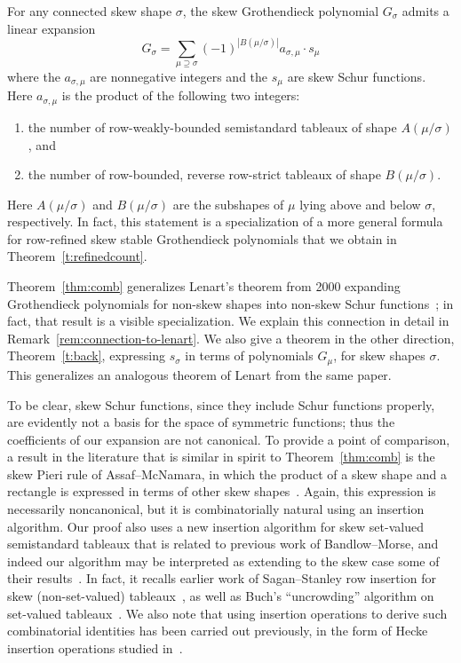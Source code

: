 \documentclass[ALCO,ThmDefs,Unicode,epreuves]{cedram}
\begin{document}
\begin{theo}\label{thm:comb}
For any connected skew shape $\sigma$, the skew Grothendieck polynomial $G_\sigma$ admits a linear expansion 
\[
G_\sigma = \sum_{\mu\supseteq \sigma} (-1)^{|B(\mu/\sigma)|} a_{\sigma,\mu} \cdot s_\mu
\]
where the $a_{\sigma, \mu}$ are nonnegative integers and the $s_\mu$ are skew Schur functions. Here $a_{\sigma,\mu}$ is the product of the following two integers:


\begin{enumerate}
\item\label{theo1.1_1} the number of row-weakly-bounded semistandard tableaux of shape $A(\mu/\sigma)$, and
\item\label{theo1.1_2} the number of row-bounded, reverse row-strict tableaux of shape $B(\mu/\sigma)$.
\end{enumerate}
\end{theo}

\noindent Here $A(\mu/\sigma)$ and $B(\mu/\sigma)$ are the subshapes of $\mu$ lying above and below $\sigma$, respectively. In fact, this statement is a specialization of a more general formula for row-refined skew stable Grothendieck polynomials that we obtain in Theorem~\ref{t:refinedcount}. 

Theorem~\ref{thm:comb} generalizes Lenart's theorem from 2000 expanding Grothendieck polynomials for non-skew shapes into non-skew Schur functions~\cite{lenart-combinatorial}; in fact, that result is a visible specialization. We explain this connection in detail in Remark~\ref{rem:connection-to-lenart}. We also give a theorem in the other direction, Theorem~\ref{t:back}, expressing $s_\sigma$ in terms of polynomials $G_\mu$, for skew shapes $\sigma$. This generalizes an analogous theorem of Lenart from the same paper.



To be clear, skew Schur functions, since they include Schur functions properly, are evidently not a basis for the space of symmetric functions; thus the coefficients of our expansion are not canonical. 
To provide a point of comparison, a result in the literature that is similar in spirit to Theorem~\ref{thm:comb} is the skew Pieri rule of Assaf--McNamara, in which the product of a skew shape and a rectangle is expressed in terms of other skew shapes~\cite[Theorem~3.2]{assaf-mcnamara-pieri}. Again, this expression is necessarily noncanonical, but it is combinatorially natural using an insertion algorithm. Our proof also uses a new insertion algorithm for skew set-valued semistandard tableaux that is related to previous work of Bandlow--Morse, and indeed our algorithm may be interpreted as extending to the skew case some of their results~\cite[\S~5]{bandlow-morse-combinatorial}. In fact, it recalls earlier work of Sagan--Stanley row insertion for skew (non-set-valued) tableaux~\cite{sagan-stanley-robinson}, as well as Buch's ``uncrowding'' algorithm on set-valued tableaux~\cite[\S~6]{buch-littlewood-richardson}. We also note that using insertion operations to derive such combinatorial identities has been carried out previously, in the form of Hecke insertion operations studied in~\cite{bksty-stable}.
\end{document}
